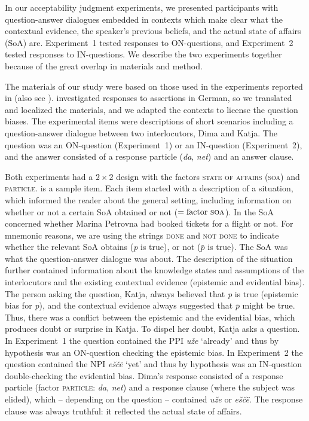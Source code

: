 \documentclass[output=paper,colorlinks,citecolor=brown]{langscibook}
\begin{document}
In our acceptability judgment experiments, we presented participants with question-answer dialogues embedded in contexts which make clear what the contextual evidence, the speaker’s previous beliefs, and the actual state of affairs (SoA) are. Experiment~1 tested responses to ON-questions, and Experiment~2 tested responses to IN-questions. We describe the two experiments together because of the great overlap in materials and method.

The materials of our study were based on those used in the experiments reported in \citet{ClausMeijerReppKrifka2017} (also see \citealt{MeijerClausReppKrifka2015}). \citeauthor{ClausMeijerReppKrifka2017} investigated responses to assertions in German, so we translated and localized the materials, and we adapted the contexts to license the question biases. The experimental items were descriptions of short scenarios including a question-answer dialogue between two interlocutors, Dima and Katja. The question was an ON-question (Experiment~1) or an IN-question (Experiment~2), and the answer consisted of a response particle (\textit{da}, \textit{net}) and an answer clause. 

Both experiments had a $2\times2$ design with the factors \textsc{state of affairs (soa)} and \textsc{particle}.  is a sample item.  Each item started with a description of a situation, which informed the reader about the general setting, including information on whether or not a certain SoA obtained or not ($=\text{factor \textsc{soa}}$). In  the SoA concerned whether Marina \mbox{Petrovna} had booked tickets for a flight or not. For mnemonic reasons, we are using the strings \textsc{done} and \textsc{not done} to indicate whether the relevant SoA obtains (\textit{p} is true), or not ($\bar{p}$ is true). The SoA was what the question-answer dialogue was about. The description of the situation further contained information about the knowledge states and assumptions of the interlocutors and the existing contextual evidence (epistemic and evidential bias). The person asking the question, Katja, always believed that \textit{p} is true (epistemic bias for \textit{p}), and the contextual evidence always suggested that $\bar{p}$ might be true. Thus, there was a conflict between the epistemic and the evidential bias, which produces doubt or surprise in Katja. To dispel her doubt, Katja asks a question. In Experiment~1 the question contained the PPI \textit{uže} ‘already’ and thus by hypothesis was an ON-question checking the epistemic bias. In Experiment~2 the question contained the NPI \textit{eščë} ‘yet’ and thus by hypothesis was an IN-question double-checking the evidential bias. Dima's response consisted of a response particle (factor \textsc{particle}: \textit{da}, \textit{net}) and a response clause (where the subject was elided), which -- depending on the question -- contained \textit{uže} or \textit{eščë}. The response clause was always truthful: it reflected the actual state of affairs.
\end{document}
